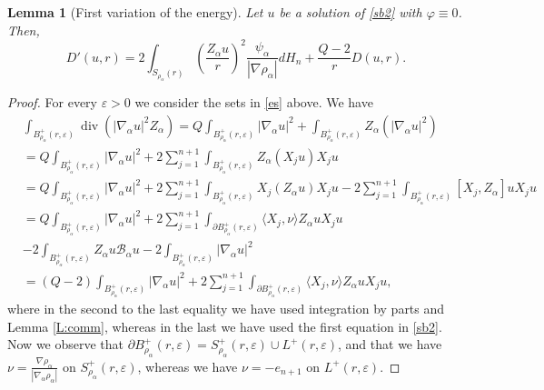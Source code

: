 \documentclass[11pt]{amsart}
\theoremstyle{plain}
\newtheorem{lemma}[thrm]{Lemma}
\numberwithin{equation}{section}
\begin{document}
\begin{lemma}[First variation of the energy]\label{l:dprime}
 Let $u$ be a solution of \eqref{sb2} with ${\varphi}\equiv 0$. Then,
 \begin{equation}\label{D'u2}
  D'(u,r)=2\int_{{S_{\rho_\alpha}(r)}}\left(\frac{Z_\alpha u}{r}\right)^2\frac{\psi_\alpha}{|\nabla {\rho_\alpha}|}dH_{n}+\frac{Q-2}{r}D(u,r).
 \end{equation}
\end{lemma}

\begin{proof}
For every ${\varepsilon}>0$ we consider the sets in \eqref{es} above. We have
\begin{align*}
& \int_{B^+_{\rho_\alpha}(r,{\varepsilon})} \operatorname{div}(|{\nabla_\alpha} u|^2 Z_\alpha) = Q \int_{B^+_{\rho_\alpha}(r,{\varepsilon})} |{\nabla_\alpha} u|^2 +  \int_{B^+_{\rho_\alpha}(r,{\varepsilon})} Z_\alpha(|{\nabla_\alpha} u|^2)
\\
& =  Q \int_{B^+_{\rho_\alpha}(r,{\varepsilon})} |{\nabla_\alpha} u|^2 + 2 \sum_{j=1}^{n+1} \int_{B^+_{\rho_\alpha}(r,{\varepsilon})} Z_\alpha(X_j u) X_j u
\\
& =  Q \int_{B^+_{\rho_\alpha}(r,{\varepsilon})} |{\nabla_\alpha} u|^2 + 2 \sum_{j=1}^{n+1} \int_{B^+_{\rho_\alpha}(r,{\varepsilon})} X_j(Z_\alpha u) X_j u -  2 \sum_{j=1}^{n+1} \int_{B^+_{\rho_\alpha}(r,{\varepsilon})} [X_j,Z_\alpha] u X_j u
\\
& =  Q \int_{B^+_{\rho_\alpha}(r,{\varepsilon})} |{\nabla_\alpha} u|^2 + 2 \sum_{j=1}^{n+1} \int_{{\partial} B^+_{\rho_\alpha}(r,{\varepsilon})} \langle X_j,\nu\rangle Z_\alpha u X_j u
\\
& - 2 \int_{B^+_{\rho_\alpha}(r,{\varepsilon})} Z_\alpha u {\mathcal{B}_\alpha} u -  2 \int_{B^+_{\rho_\alpha}(r,{\varepsilon})} |{\nabla_\alpha} u|^2
\\
& =  (Q-2) \int_{B^+_{\rho_\alpha}(r,{\varepsilon})} |{\nabla_\alpha} u|^2 + 2 \sum_{j=1}^{n+1} \int_{{\partial} B^+_{\rho_\alpha}(r,{\varepsilon})} \langle X_j,\nu\rangle Z_\alpha u X_j u,
\end{align*}
where in the second to the last equality we have used integration by parts and Lemma \ref{L:comm}, whereas in the last we have used the first equation in \eqref{sb2}. Now we observe that ${\partial} B^+_{\rho_\alpha}(r,{\varepsilon}) = S^+_{\rho_\alpha}(r,{\varepsilon}) \cup L^+(r,{\varepsilon})$, and that we have $\nu = \frac{\nabla \rho_\alpha}{|{\nabla_\alpha} \rho_\alpha|}$ on $S^+_{\rho_\alpha}(r,{\varepsilon})$, whereas we have $\nu = - e_{n+1}$ on $L^+(r,{\varepsilon})$.

\end{proof}
\end{document}
